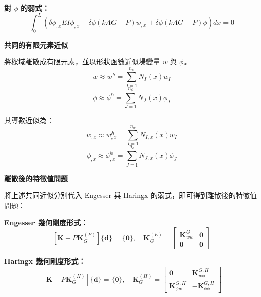 ﻿\documentclass[UTF8, a4paper, 12pt]{ctexart}
\begin{document}
\textbf{對 $\phi$ 的弱式：}
\begin{equation}
  \int_{0}^{L}\left(\delta\phi_{,x}EI\phi_{,x}-\delta\phi (kAG+P)w_{,x}+\delta\phi (kAG+P)\phi\right)dx = 0
\end{equation}


\medskip
\noindent\textbf{共同的有限元素近似}

將樑域離散成有限元素，並以形狀函數近似場變量 $w$ 與 $\phi$。
\begin{equation}
  w \approx w^{h} = \sum_{I=1}^{n_{w}}N_{I}(x)w_{I}
\end{equation}
\begin{equation}
  \phi \approx \phi^{h} = \sum_{J=1}^{n_{\phi}}N_{J}(x)\phi_{J}
\end{equation}

其導數近似為：
\begin{equation}
  w_{,x} \approx w_{,x}^{h} = \sum_{I=1}^{n_{w}}N_{I,x}(x)w_{I}
\end{equation}
\begin{equation}
  \phi_{,x} \approx \phi_{,x}^{h} = \sum_{J=1}^{n_{\phi}}N_{J,x}(x)\phi_{J}
\end{equation}


\medskip
\noindent\textbf{離散後的特徵值問題}

將上述共同近似分別代入 Engesser 與 Haringx 的弱式，即可得到離散後的特徵值問題：

\textbf{Engesser 幾何剛度形式：}
\begin{equation}
  \left[\mathbf{K} - P \mathbf{K}_G^{(E)}\right]\{\mathbf{d}\} = \{\mathbf{0}\},\quad
  \mathbf{K}_G^{(E)}=
  \begin{bmatrix}
    \mathbf{K}_{ww}^{G} & \mathbf{0} \\
    \mathbf{0} & \mathbf{0}
  \end{bmatrix}
\end{equation}

\textbf{Haringx 幾何剛度形式：}
\begin{equation}
  \left[\mathbf{K} - P \mathbf{K}_G^{(H)}\right]\{\mathbf{d}\} = \{\mathbf{0}\},\quad
  \mathbf{K}_G^{(H)}=
  \begin{bmatrix}
    \mathbf{0} & \mathbf{K}_{w\phi}^{G,H} \\
    \mathbf{K}_{\phi w}^{G,H} & -\mathbf{K}_{\phi\phi}^{G,H}
  \end{bmatrix}
\end{equation}
\end{document}
